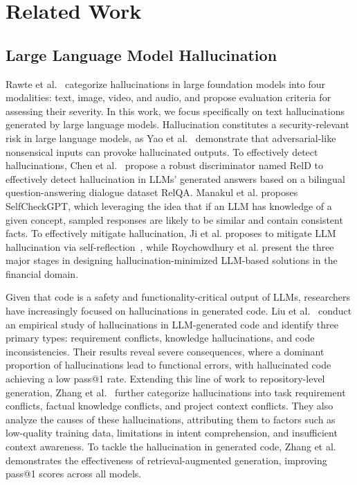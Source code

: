 \section{Related Work}


\subsection{Large Language Model Hallucination}


Rawte et al.~\cite{rawte2023survey} categorize hallucinations in large foundation models into four modalities: text, image, video, and audio, and propose evaluation criteria for assessing their severity. In this work, we focus specifically on text hallucinations generated by large language models. Hallucination constitutes a security-relevant risk in large language models, as Yao et al.~\cite{yao2023llm} demonstrate that adversarial-like nonsensical inputs can provoke hallucinated outputs. To effectively detect hallucinations, Chen et al.~ \cite{chen2023hallucination} propose a robust discriminator named RelD to effectively detect hallucination in LLMs' generated answers based on a bilingual question-answering dialogue dataset RelQA. Manakul et al.\cite{manakul2023selfcheckgpt} proposes SelfCheckGPT, which leveraging the idea that if an LLM has knowledge of a given concept, sampled responses are likely to be similar and contain consistent facts. To effectively mitigate hallucination, Ji et al. proposes to mitigate LLM hallucination via self-reflection~\cite{ji2023towards}, while Roychowdhury et al. \cite{roychowdhury2024journey} present the three major stages in designing hallucination-minimized LLM-based solutions in the financial domain.

Given that code is a safety and functionality-critical output of LLMs, researchers have increasingly focused on hallucinations in generated code. Liu et al.~\cite{liu2026beyond} conduct an empirical study of hallucinations in LLM-generated code and identify three primary types: requirement conflicts, knowledge hallucinations, and code inconsistencies. Their results reveal severe consequences, where a dominant proportion of hallucinations lead to functional errors, with hallucinated code achieving a low pass@1 rate. Extending this line of work to repository-level generation, Zhang et al.~\cite{zhang2025llm} further categorize hallucinations into task requirement conflicts, factual knowledge conflicts, and project context conflicts. They also analyze the causes of these hallucinations, attributing them to factors such as low-quality training data, limitations in intent comprehension, and insufficient context awareness. To tackle the hallucination in generated code, Zhang et al.~\cite{zhang2025llm} demonstrates the effectiveness of retrieval-augmented generation, improving pass@1 scores across all models. 

